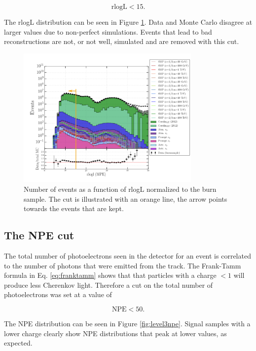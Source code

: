 \begin{equation}
\textrm{rlogL} < 15.
\end{equation}

\noindent The rlogL distribution can be seen in Figure \ref{fig:level3cutsrlogl}. Data and Monte Carlo disagree at larger values due to non-perfect simulations. Events that lead to bad reconstructions are not, or not well, simulated and are removed with this cut.


\begin{figure}[t]
\centering
\includegraphics[width=0.8\textwidth]{chapter8/img/1D_stack_mpefit_rlogl_final.png}
\caption{Number of events as a function of rlogL normalized to the burn sample. The cut is illustrated with an orange line, the arrow points towards the events that are kept.}
\label{fig:level3cutsrlogl}
\end{figure}


\subsection{The NPE cut}
The total number of photoelectrons seen in the detector for an event is correlated to the number of photons that were emitted from the track. The Frank-Tamm formula in Eq. \ref{eq:franktamm} shows that that particles with a charge $< 1$ will produce less Cherenkov light. Therefore a cut on the total number of photoelectrons was set at a value of 

\begin{equation}
\textrm{NPE} < 50.
\end{equation} 

\noindent The NPE distribution can be seen in Figure \ref{fig:level3npe}. Signal samples with a lower charge clearly show NPE distributions that peak at lower values, as  expected. 

